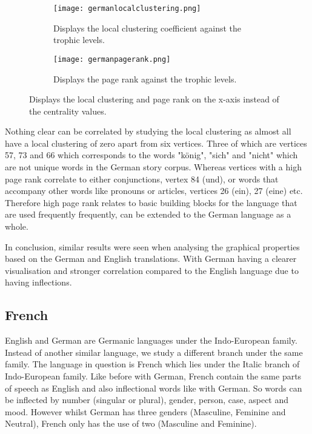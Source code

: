 \begin{figure}[H]
\centering
\begin{subfigure}{.45\textwidth}
	\hspace{-1cm} 
	\texttt{[image: germanlocalclustering.png]}
	\caption{Displays the local clustering coefficient against the trophic levels.}
	\label{fig:gerlc}
\end{subfigure}
\hfill
\begin{subfigure}{.45\textwidth}
	\hspace{-1cm} 
	\texttt{[image: germanpagerank.png]}
	\caption{Displays the page rank against the trophic levels.}
	\label{fig:gerpr}
\end{subfigure}
\caption{Displays the local clustering and page rank on the x-axis instead of the centrality values.}
\label{fig:gerother}
\end{figure}

Nothing clear can be correlated by studying the local clustering as almost all have a local clustering of zero apart from six vertices. Three of which are vertices 57, 73 and 66 which corresponds to the words "könig", "sich" and "nicht" which are not unique words in the German story corpus. Whereas vertices with a high page rank correlate to either conjunctions, vertex 84 (und), or words that accompany other words like pronouns or articles, vertices 26 (ein), 27 (eine) etc. Therefore high page rank relates to basic building blocks for the language that are used frequently frequently, can be extended to the German language as a whole.

In conclusion, similar results were seen when analysing the graphical properties based on the German and English translations. With German having a clearer visualisation and stronger correlation compared to the English language due to having inflections.

\subsection{French}
English and German are Germanic languages under the Indo-European family. Instead of another similar language, we study a different branch under the same family. The language in question is French which lies under the Italic branch of Indo-European family. Like before with German, French contain the same parts of speech as English and also inflectional words like with German. So words can be inflected by number (singular or plural), gender, person, case, aspect and mood. However whilst German has three genders (Masculine, Feminine and Neutral), French\cite{hawkins2015french} only has the use of two (Masculine and Feminine). 

